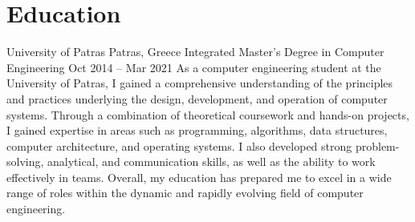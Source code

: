 \section{Education}

\begin{itemize}
    \cventryiv
        {University of Patras}
        {Patras, Greece}
        {Integrated Master's Degree in Computer Engineering}
        {Oct 2014 -- Mar 2021}
    \cventryi
        {As a computer engineering student at the University of Patras, I gained a comprehensive understanding of the principles and practices underlying the design, development, and operation of computer systems. Through a combination of theoretical coursework and hands-on projects, I gained expertise in areas such as programming, algorithms, data structures, computer architecture, and operating systems. I also developed strong problem-solving, analytical, and communication skills, as well as the ability to work effectively in teams. Overall, my education has prepared me to excel in a wide range of roles within the dynamic and rapidly evolving field of computer engineering.}
\end{itemize}
